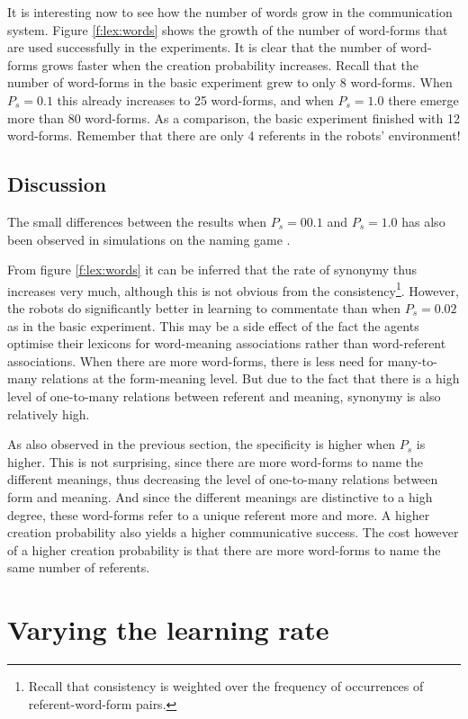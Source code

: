It is interesting now to see how the number of words grow in the communication system. Figure \ref{f:lex:words} shows the growth of the number of word-forms that are used successfully in the experiments. It is clear that the number of word-forms grows faster when the creation probability increases. Recall that the number of word-forms in the basic experiment grew to only 8 word-forms. When $P_s=0.1$ this already increases to 25 word-forms, and when $P_s=1.0$ there emerge more than 80 word-forms. As a comparison, the basic experiment finished with 12 word-forms. Remember that there are only 4 referents in the robots' environment!

\subsection{Discussion}

The small differences between the results when $P_s=00.1$ and $P_s=1.0$ has also been observed in simulations on the naming game \citep{kaplan:2000}.

From figure \ref{f:lex:words} it can be inferred that the rate of synonymy thus increases very much, although this is not obvious from the consistency\footnote{Recall that consistency is weighted over the frequency of occurrences of referent-word-form pairs.}. However, the robots do significantly better in learning to commentate than when $P_s=0.02$ as in the basic experiment. This may be a side effect of the fact the agents optimise their lexicons for word-meaning associations rather than word-referent associations. When there are more word-forms, there is less need for many-to-many relations at the form-meaning level. But due to the fact that there is a high level of one-to-many relations between referent and meaning, synonymy is also relatively high.

As also observed in the previous section, the specificity is higher when $P_s$ is higher. This is not surprising, since there are more word-forms to name the different meanings, thus decreasing the level of one-to-many relations between form and meaning. And since the different meanings are distinctive to a high degree, these word-forms refer to a unique referent more and more. A higher creation probability also yields a higher communicative success. The cost however of a higher creation probability is that there are more word-forms to name the same number of referents.

\section{Varying the learning rate}\label{s:par:lr}

